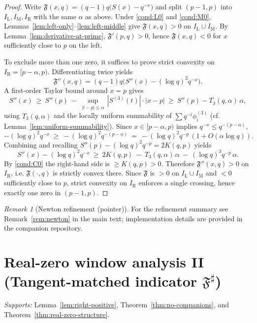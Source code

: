 \documentclass[11pt,a4paper]{amsart}
\newcommand{\Fbase}{\mathfrak F}
\newcommand{\Fsharp}{\Fbase^{\sharp}}
\theoremstyle{plain}
\theoremstyle{definition}
\theoremstyle{remark}
\newtheorem{remark}[theorem]{Remark}
\begin{document}
\begin{proof}
Write $\mathfrak F(x,q)=(q-1)q\big(S(x)-q^{-x}\big)$ and split $(p-1,p)$ into $I_{\mathrm L},I_{\mathrm M},I_{\mathrm R}$ with the same $\alpha$ as above. Under \eqref{cond:L0} and \eqref{cond:M0}, Lemmas~\ref{lem:left-only}–\ref{lem:left-middle} give $\mathfrak F(x,q)>0$ on $I_{\mathrm L}\cup I_{\mathrm M}$. By Lemma~\ref{lem:derivative-at-prime}, $\mathfrak F'(p,q)>0$, hence $\mathfrak F(x,q)<0$ for $x$ sufficiently close to $p$ on the left.

To exclude more than one zero, it suffices to prove strict convexity on $I_{\mathrm R}=[p-\alpha,p)$. Differentiating twice yields
\[
\mathfrak F''(x,q)=(q-1)q\Big(S''(x)-(\log q)^2 q^{-x}\Big).
\]
A first-order Taylor bound around $x=p$ gives
\[
S''(x)\ \ge\ S''(p)\ -\ \sup_{|t-p|\le\alpha}\,|S^{(3)}(t)|\cdot|x-p|\ \ge\ S''(p)-T_3(q,\alpha)\,\alpha,
\]
using $T_3(q,\alpha)$ and the locally uniform summability of $\sum q^{-i}\phi_i^{(3)}$ (cf. Lemma~\ref{lem:uniform-summability}). Since $x\in[p-\alpha,p)$ implies $q^{-x}\le q^{-(p-\alpha)}$, 
\[
-(\log q)^2 q^{-x}\ \ge\ -(\log q)^2 q^{-(p-\alpha)} \ =\ -(\log q)^2 q^{-p}\,(1+O(\alpha\log q)).
\]
Combining and recalling $S''(p)-(\log q)^2q^{-p}=2K(q,p)$ yields
\[
S''(x)-(\log q)^2q^{-x}\ \ge\ 2K(q,p)\ -\ T_3(q,\alpha)\,\alpha\ -\ (\log q)^3 q^{-p}\,\alpha.
\]
By \eqref{cond:C0} the right-hand side is $\ge K(q,p)>0$. Therefore $\mathfrak F''(x,q)>0$ on $I_{\mathrm R}$, i.e. $\mathfrak F(\cdot,q)$ is strictly convex there. Since $\mathfrak F$ is $>0$ on $I_{\mathrm L}\cup I_{\mathrm M}$ and $<0$ sufficiently close to $p$, strict convexity on $I_{\mathrm R}$ enforces a single crossing, hence exactly one zero in $(p-1,p)$.
\end{proof}

\begin{remark}[Newton refinement (pointer)]
For the refinement summary see Remark~\ref{rem:newton} in the main text; implementation details are provided in the companion repository.
\end{remark}

\section{Real-zero window analysis II (Tangent-matched indicator $\Fsharp$)}\label{app:real-zero-fsharp}
\noindent\textit{Supports:} Lemma~\ref{lem:right-positive}, Theorem~\ref{thm:no-companions}, and Theorem~\ref{thm:real-zero-structure}.
\end{document}
